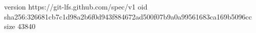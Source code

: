 version https://git-lfs.github.com/spec/v1
oid sha256:326681cb7c1d98a2b6f0d943f884672ad500f07b9a0a99561683ca169b5096cc
size 43840
